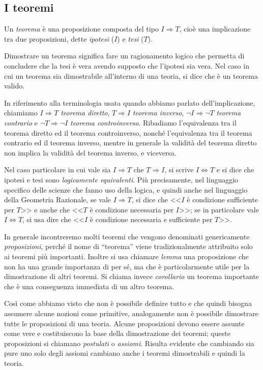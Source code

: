 \subsection{I teoremi}

Un \emph{teorema} è una proposizione composta del tipo  $I\Rightarrow T$, cioè una implicazione tra due proposizioni, dette \emph{ipotesi} ($I$) e \emph{tesi} ($T$).

Dimostrare un teorema significa fare un ragionamento logico che permetta di concludere che la tesi è vera avendo supposto che l'ipotesi sia vera. Nel caso in cui un teorema sia dimostrabile all'interno di una teoria, si dice che è un teorema valido.

In riferimento alla terminologia usata quando abbiamo parlato dell'implicazione, chiamiamo  $I\Rightarrow T$ \emph{teorema diretto}, $T\Rightarrow I$ \emph{teorema inverso}, $\neg I\Rightarrow \neg T$ \emph{teorema contrario} e $\neg T\Rightarrow \neg I$ \emph{teorema controinverso}. Ribadiamo l'equivalenza tra il teorema diretto ed il teorema controinverso, nonché l'equivalenza tra il teorema contrario ed il teorema inverso, mentre in generale la validità del teorema diretto non implica la validità del teorema inverso, e viceversa.

Nel caso particolare in cui vale sia $I\Rightarrow T$ che $T\Rightarrow I$, si scrive  $I\Leftrightarrow T$ e si dice che ipotesi e tesi sono \emph{logicamente equivalenti}. Più precisamente, nel linguaggio specifico delle scienze che fanno uso della logica, e quindi anche nel linguaggio della Geometria Razionale, se vale $I\Rightarrow T$, si dice che <<$I$ è condizione sufficiente per $T$>> e anche che <<$T$ è condizione necessaria per $I$>>; se in particolare vale  $I\Leftrightarrow T$, si usa dire che <<$I$ è condizione necessaria e sufficiente per $T$>>.

In generale incontreremo molti teoremi che vengono denominati genericamente \emph{proposizioni}, perché il nome di ``teorema'' viene tradizionalmente attribuito solo ai teoremi più importanti. Inoltre si usa chiamare \emph{lemma} una proposizione che non ha una grande importanza di per sé, ma che è particolarmente utile per la dimostrazione di altri teoremi. Si chiama invece \emph{corollario} un teorema importante che è una conseguenza immediata di un altro teorema.

Così come abbiamo visto che non è possibile definire tutto e che quindi bisogna assumere alcune nozioni come primitive, analogamente non è possibile dimostrare tutte le proposizioni di una teoria. Alcune proposizioni devono essere assunte come vere e costituiscono la base della dimostrazione dei teoremi; queste proposizioni si chiamano \emph{postulati} o \emph{assiomi}. Risulta evidente che cambiando sia pure uno solo degli assiomi cambiano anche i teoremi dimostrabili e quindi la teoria.

